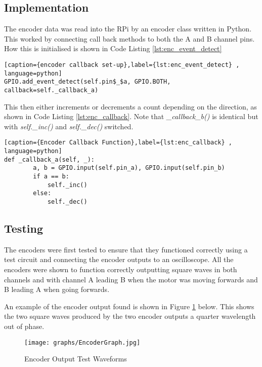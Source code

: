 \subsection{Implementation}\label{elec/encoder/impl}

The encoder data was read into the RPi by an encoder class written in
Python. This worked by connecting call back methods to both the A and B
channel pins. How this is initialised is shown in Code Listing
\ref{lst:enc_event_detect}


\begin{lstlisting}[caption={encoder callback set-up},label={lst:enc_event_detect} , language=python]
GPIO.add_event_detect(self.pin$_$a, GPIO.BOTH, callback=self._callback_a)
\end{lstlisting}

This then either increments or decrements a count depending on the
direction, as shown in Code Listing \ref{lst:enc_callback}. Note that
\textit{\_callback\_b()} is identical but with \textit{self.\_inc()} and
\textit{self.\_dec()} switched.

\begin{lstlisting}[caption={Encoder Callback Function},label={lst:enc_callback} , language=python]
def _callback_a(self, _):
        a, b = GPIO.input(self.pin_a), GPIO.input(self.pin_b)
        if a == b:
            self._inc()
        else:
            self._dec()
\end{lstlisting}


\subsection{Testing}\label{elec/encoder/test}
The encoders were first tested to ensure that they functioned correctly
using a test circuit and connecting the encoder outputs to an
oscilloscope. All the encoders were shown to function correctly
outputting square waves in both channels and with channel A leading B
when the motor was moving forwards and B leading A when going forwards.

An example of the encoder output found is shown in Figure
\ref{EncoderGraph} below. This shows the two square waves produced by the
two encoder outputs a quarter wavelength out of phase.

\begin{figure}[!ht]
	\centering
	\texttt{[image: graphs/EncoderGraph.jpg]}
	\caption{Encoder Output Test Waveforms}\label{EncoderGraph}

\end{figure}

